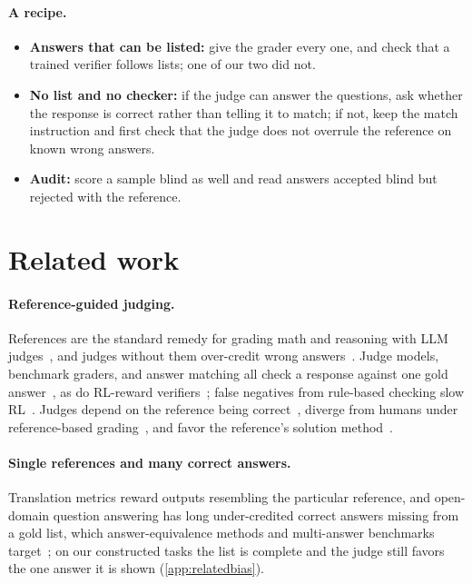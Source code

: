 \documentclass{article}
\begin{document}
\paragraph{A recipe.}
\begin{itemize}[leftmargin=1.2em,itemsep=0pt,topsep=1pt,parsep=0pt]
\item \textbf{Answers that can be listed:} give the grader every one, and check that a trained verifier follows lists; one of our two did not.
\item \textbf{No list and no checker:} if the judge can answer the questions, ask whether the response is correct rather than telling it to match; if not, keep the match instruction and first check that the judge does not overrule the reference on known wrong answers.
\item \textbf{Audit:} score a sample blind as well and read answers accepted blind but rejected with the reference.
\end{itemize}

\section{Related work}
\label{sec:related}

\paragraph{Reference-guided judging.}
References are the standard remedy for grading math and reasoning with LLM judges~\citep{zheng2023judging,refguided2024,chen2026rethinking}, and judges without them over-credit wrong answers~\citep{generous2026}. Judge models, benchmark graders, and answer matching all check a response against one gold answer~\citep{zhu2023judgelm,kim2024prometheus,wei2024simpleqa,wei2025browsecomp,phan2025hle,chandak2025answermatching}, as do RL-reward verifiers~\citep{chen2025xverify,liu2025compassverifier,yan2025verifybench}; false negatives from rule-based checking slow RL~\citep{xu2025tinyv,huang2025pitfalls}.
Judges depend on the reference being correct~\citep{judgingref2026,krumdick2025nofreelabels}, diverge from humans under reference-based grading~\citep{thakur2024judging}, and favor the reference's solution method~\citep{fixation2025}.

\paragraph{Single references and many correct answers.}
Translation metrics reward outputs resembling the particular reference, and open-domain question answering has long under-credited correct answers missing from a gold list, which answer-equivalence methods and multi-answer benchmarks target~\citep{min2020ambigqa,kamalloo2023evaluating,amouyal2022qampari,li2024pedants}; on our constructed tasks the list is complete and the judge still favors the one answer it is shown (\cref{app:relatedbias}).
\end{document}
